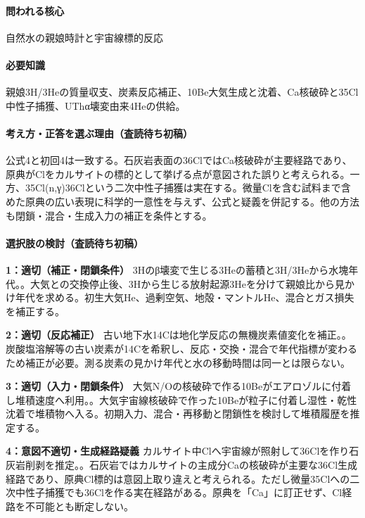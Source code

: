 \paragraph{問われる核心} 自然水の親娘時計と宇宙線標的反応

\paragraph{必要知識} 親娘3H/3Heの質量収支、炭素反応補正、10Be大気生成と沈着、Ca核破砕と35Cl中性子捕獲、UThα壊変由来4Heの供給。

\paragraph{考え方・正答を選ぶ理由（査読待ち初稿）} 公式4と初回4は一致する。石灰岩表面の36ClではCa核破砕が主要経路であり、原典がClをカルサイトの標的として挙げる点が意図された誤りと考えられる。一方、35Cl(n,γ)36Clという二次中性子捕獲は実在する。微量Clを含む試料まで含めた原典の広い表現に科学的一意性を与えず、公式と疑義を併記する。他の方法も閉鎖・混合・生成入力の補正を条件とする。

\paragraph{選択肢の検討（査読待ち初稿）}\mbox{}\par

\noindent\textbf{1：適切（補正・閉鎖条件）} 3Hのβ壊変で生じる3Heの蓄積と3H/3Heから水塊年代。。大気との交換停止後、3Hから生じる放射起源3Heを分けて親娘比から見かけ年代を求める。初生大気He、過剰空気、地殻・マントルHe、混合とガス損失を補正する。\par

\noindent\textbf{2：適切（反応補正）} 古い地下水14Cは地化学反応の無機炭素値変化を補正。。炭酸塩溶解等の古い炭素が14Cを希釈し、反応・交換・混合で年代指標が変わるため補正が必要。測る炭素の見かけ年代と水の移動時間は同一とは限らない。\par

\noindent\textbf{3：適切（入力・閉鎖条件）} 大気N/Oの核破砕で作る10Beがエアロゾルに付着し堆積速度へ利用。。大気宇宙線核破砕で作った10Beが粒子に付着し湿性・乾性沈着で堆積物へ入る。初期入力、混合・再移動と閉鎖性を検討して堆積履歴を推定する。\par

\noindent\textbf{4：意図不適切・生成経路疑義} カルサイト中Clへ宇宙線が照射して36Clを作り石灰岩削剥を推定。。石灰岩ではカルサイトの主成分Caの核破砕が主要な36Cl生成経路であり、原典Cl標的は意図上取り違えと考えられる。ただし微量35Clへの二次中性子捕獲でも36Clを作る実在経路がある。原典を「Ca」に訂正せず、Cl経路を不可能とも断定しない。\par

